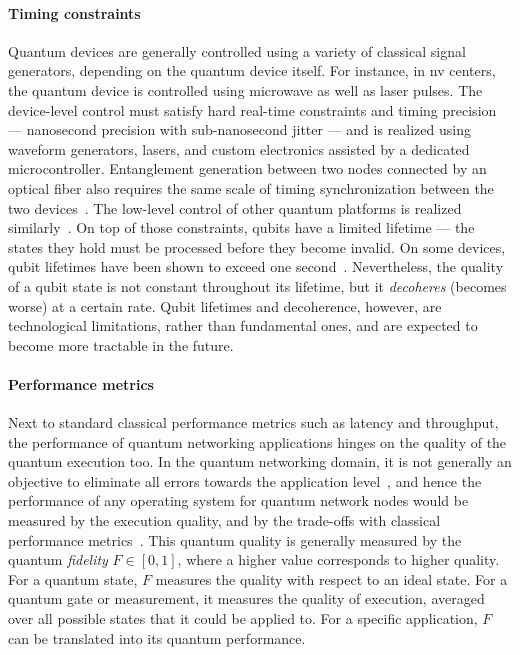 \paragraph{Timing constraints}

Quantum devices are generally controlled using a variety of classical signal generators, depending
on the quantum device itself. For instance, in \acrshort{nv} centers, the quantum device is
controlled using microwave as well as laser pulses. The device-level control must satisfy hard
real-time constraints and timing precision --- nanosecond precision with sub-nanosecond jitter ---
and is realized using waveform generators, lasers, and custom electronics assisted by a dedicated
microcontroller. Entanglement generation between two nodes connected by an optical fiber also
requires the same scale of timing synchronization between the two devices~\cite{dahlberg_2019_egp,
pompili_2022_experimental}. The low-level control of other quantum platforms is realized
similarly~\cite{moehring_2007_ion_traps, reiserer_2015_neutral_atoms}. On top of those constraints,
qubits have a limited lifetime --- the states they hold must be processed before they become
invalid. On some devices, qubit lifetimes have been shown to exceed one
second~\cite{abobeih_2018_one_sec}. Nevertheless, the quality of a qubit state is not constant
throughout its lifetime, but it \emph{decoheres} (becomes worse) at a certain rate. Qubit lifetimes
and decoherence, however, are technological limitations, rather than fundamental ones, and are
expected to become more tractable in the future.

\paragraph{Performance metrics}

Next to standard classical performance metrics such as latency and throughput, the performance of
quantum networking applications hinges on the quality of the quantum execution too. In the quantum
networking domain, it is not generally an objective to eliminate all errors towards the application
level~\cite{dahlberg_2019_egp, vardoyan_2022_netarch}, and hence the performance of any operating
system for quantum network nodes would be measured by the execution quality, and by the trade-offs
with classical performance metrics~\cite{dahlberg_2019_egp, vardoyan_2022_netarch}. This quantum
quality is generally measured by the quantum \emph{fidelity} $F \in [0,1]$, where a higher value
corresponds to higher quality. For a quantum state, $F$ measures the quality with respect to an
ideal state. For a quantum gate or measurement, it measures the quality of execution, averaged over
all possible states that it could be applied to. For a specific application, $F$ can be translated
into its quantum performance.


